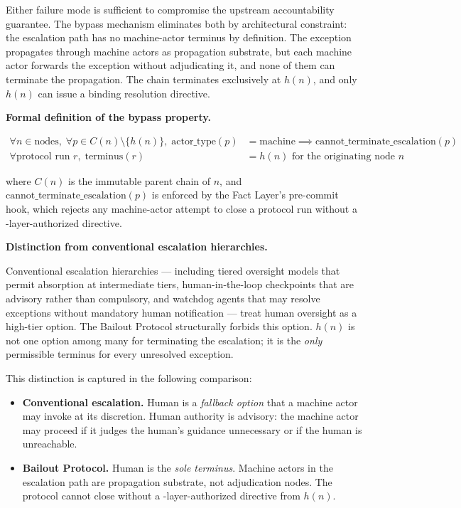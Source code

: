 Either failure mode is sufficient to compromise the upstream accountability guarantee. The bypass mechanism eliminates both by architectural constraint: the escalation path has no machine-actor terminus by definition. The exception propagates through machine actors as propagation substrate, but each machine actor forwards the exception without adjudicating it, and none of them can terminate the propagation. The chain terminates exclusively at $h(n)$, and only $h(n)$ can issue a binding resolution directive.

\bigskip
\noindent\textbf{Formal definition of the bypass property.}

\begin{align}
\forall n \in \text{nodes},\; \forall p \in C(n) \setminus \{h(n)\},\; \text{actor\_type}(p) &= \text{machine} \implies \text{cannot\_terminate\_escalation}(p) \tag{BP-1} \\
\forall \text{protocol run } r,\; \text{terminus}(r) &= h(n) \text{ for the originating node } n \tag{BP-2}
\end{align}

where $C(n)$ is the immutable parent chain of $n$, and $\text{cannot\_terminate\_escalation}(p)$ is enforced by the Fact Layer's pre-commit hook, which rejects any machine-actor attempt to close a protocol run without a \purpose-layer-authorized directive.

\bigskip
\noindent\textbf{Distinction from conventional escalation hierarchies.}

Conventional escalation hierarchies --- including tiered oversight models that permit absorption at intermediate tiers, human-in-the-loop checkpoints that are advisory rather than compulsory, and watchdog agents that may resolve exceptions without mandatory human notification --- treat human oversight as a high-tier option. The Bailout Protocol structurally forbids this option. $h(n)$ is not one option among many for terminating the escalation; it is the \emph{only} permissible terminus for every unresolved exception.

This distinction is captured in the following comparison:

\begin{itemize}\itemsep=0pt
\item \textbf{Conventional escalation.} Human is a \emph{fallback option} that a machine actor may invoke at its discretion. Human authority is advisory: the machine actor may proceed if it judges the human's guidance unnecessary or if the human is unreachable.

\item \textbf{Bailout Protocol.} Human is the \emph{sole terminus}. Machine actors in the escalation path are propagation substrate, not adjudication nodes. The protocol cannot close without a \purpose-layer-authorized directive from $h(n)$.
\end{itemize}

